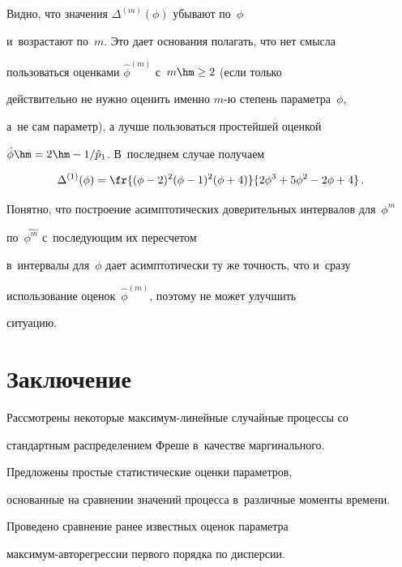 Видно, что значения $\Delta^{(m)}(\phi)$ убывают по~$\phi$ 


и~возрастают по~$m$. Это дает основания полагать, что нет смысла


пользоваться оценками ${\hat \phi}^{(m)}$ с~$m\hm\ge 2$ (если только


действительно не нужно оценить именно $m$-ю степень параметра~$\phi$, 


а~не сам параметр), а лучше пользоваться простейшей оценкой


${\hat \phi}\hm=2\hm-1/{\hat p}_1$. В~последнем случае получаем


$$


\Delta^{(1)}(\phi)=\fr{(\phi-2)^2(\phi-1)^2(\phi+4)}{2\phi^3+5\phi^2-2\phi+4}\,.


$$





Понятно, что построение асимптотических доверительных интервалов для~$\phi^m$ 


по~$\widehat{\phi^m}$ с~последующим их пересчетом 


в~интервалы для~$\phi$ дает асимптотически ту же точность, что и~сразу


использование оценок~${\hat \phi}^{(m)}$, поэтому не может улучшить


ситуацию.





\section{Заключение}





Рассмотрены некоторые максимум-ли\-ней\-ные случайные процессы со


стандартным распределением Фреше в~качестве маргинального.


Предложены простые статистические оценки параметров,


основанные на сравнении значений процесса в~различные моменты времени.


Проведено сравнение ранее известных оценок параметра


мак\-си\-мум-ав\-то\-ре\-грес\-сии первого порядка по дисперсии.





